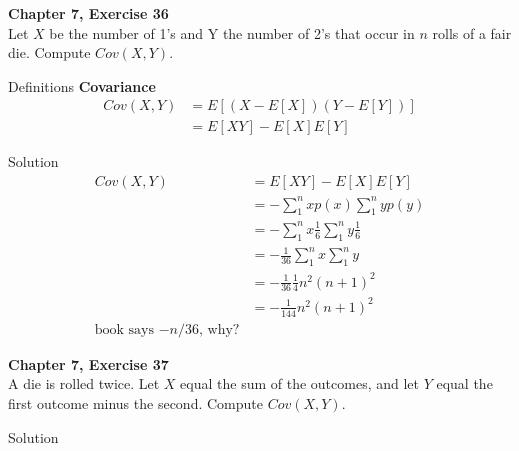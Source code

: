 \documentclass{article}
\begin{document}
\begin{spacing}{1.1}
\maketitle
\newpage
\begin{homeworkProblem}
  {\bf Chapter 7, Exercise 36}\\
  Let $X$ be the number of 1's and Y the number of 2's that occur in 
  $n$ rolls of a fair die. Compute $Cov( X, Y)$.
  \begin{homeworkSection}{Definitions}
  {\bf Covariance}\\
    \begin{align*}
      Cov( X, Y) &= E[ (X - E[X]) (Y - E[Y])] \\
      &= E[ XY] - E[ X]E[ Y]
    \end{align*}
  \end{homeworkSection}
  \begin{homeworkSection}{Solution}
    \begin{align*}
      Cov( X, Y) &= E[ XY] - E[ X]E[ Y]\\
      &= -\sum\limits_1^n x p(x) \sum\limits_1^n y p(y)\\
      &= -\sum\limits_1^n x \frac{ 1}{ 6} \sum\limits_1^n y \frac{ 1}{ 6}\\
      &= -\frac{ 1}{ 36} \sum\limits_1^n x \sum\limits_1^n y\\
      &= -\frac{ 1}{ 36} \frac{ 1}{ 4} n^2 (n + 1)^2\\
      &= -\frac{ 1}{ 144} n^2 (n + 1)^2\\
      \text{book says $-n/36$, why?}
    \end{align*}
  \end{homeworkSection}
\end{homeworkProblem}

\newpage
\begin{homeworkProblem}
  {\bf Chapter 7, Exercise 37}\\
  A die is rolled twice. Let $X$ equal the sum of the outcomes, and 
  let $Y$ equal the first outcome minus the second. Compute $Cov(X, Y)$.
  \begin{homeworkSection}{Solution}
    
  \end{homeworkSection}
\end{homeworkProblem}


\end{spacing}
\end{document}
